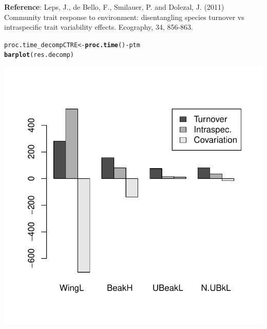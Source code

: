 \documentclass[12pt]{article}\usepackage[]{graphicx}\usepackage[]{color}
\makeatletter
\def\maxwidth{ %
  \ifdim\Gin@nat@width>\linewidth
    \linewidth
  \else
    \Gin@nat@width
  \fi
}
\newcommand{\hlopt}[1]{\textcolor[rgb]{0,0,0}{#1}}%
\newcommand{\hlstd}[1]{\textcolor[rgb]{0.345,0.345,0.345}{#1}}%
\newcommand{\hlkwb}[1]{\textcolor[rgb]{0.69,0.353,0.396}{#1}}%
\newcommand{\hlkwd}[1]{\textcolor[rgb]{0.737,0.353,0.396}{\textbf{#1}}}%
\newenvironment{kframe}{%
 \def\at@end@of@kframe{}%
 \ifinner\ifhmode%
  \def\at@end@of@kframe{\end{minipage}}%
  \begin{minipage}{\columnwidth}%
 \fi\fi%
 \def\FrameCommand##1{\hskip\@totalleftmargin \hskip-\fboxsep
 \colorbox{shadecolor}{##1}\hskip-\fboxsep
     \hskip-\linewidth \hskip-\@totalleftmargin \hskip\columnwidth}%
 \MakeFramed {\advance\hsize-\width
   \@totalleftmargin\z@ \linewidth\hsize
   \@setminipage}}%
 {\par\unskip\endMakeFramed%
 \at@end@of@kframe}
\newenvironment{knitrout}{}{} %
\makeatother
\begin{document}
\textbf{Reference}: Leps, J., de Bello, F., Smilauer, P. and Dolezal, J. (2011) Community trait response to environment: disentangling species turnover vs intraspecific trait variability effects. Ecography, 34, 856-863.

\begin{knitrout}
\color{fgcolor}\begin{kframe}
\begin{alltt}
\hlstd{proc.time_decompCTRE} \hlkwb{<-} \hlkwd{proc.time}\hlstd{()} \hlopt{-} \hlstd{ptm}
\hlkwd{barplot}\hlstd{(res.decomp)}
\end{alltt}
\end{kframe}

{\centering \includegraphics[width=\maxwidth]{figure/unnamed-chunk-22-1} 

}



\end{knitrout}
\end{document}
